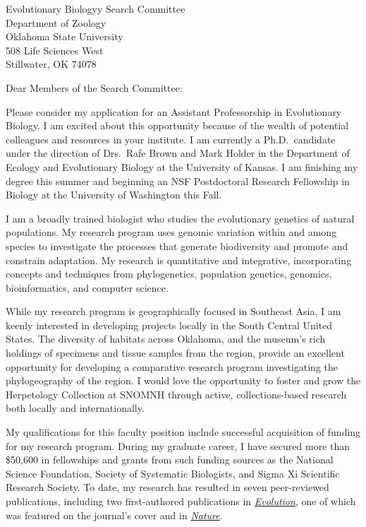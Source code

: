 \documentclass[letterpaper, 10pt]{letter}
\begin{document}
\begin{letter}{Evolutionary Biologyy Search Committee \\
                     Department of Zoology \\
                     Oklahoma State University \\
                     508 Life Sciences West \\
                     Stillwater, OK 74078}
\opening{Dear Members of the Search Committee:}
Please consider my application for an Assistant Professorship in
Evolutionary Biology.
I am excited about this opportunity because of the wealth of potential
colleagues and resources in your institute.
I am currently a Ph.D.\ candidate under the direction of Drs.\ Rafe Brown and
Mark Holder in the Department of Ecology and Evolutionary Biology at the
University of Kansas.
I am finishing my degree this summer and beginning an NSF Postdoctoral Research
Fellowship in Biology at the University of Washington this Fall.

I am a broadly trained biologist who studies the evolutionary genetics of
natural populations.
My research program uses genomic variation within and among species to
investigate the processes that generate biodiversity and promote and constrain
adaptation.
My research is quantitative and integrative, incorporating concepts and
techniques from phylogenetics, population genetics, genomics, bioinformatics,
and computer science.

While my research program is geographically focused in Southeast Asia, I am
keenly interested in developing projects locally in the South Central United
States.
The diversity of habitats across Oklahoma, and the museum's rich holdings of
specimens and tissue samples from the region, provide an excellent opportunity
for developing a comparative research program investigating the phylogeography
of the region.
I would love the opportunity to foster and grow the Herpetology Collection at
SNOMNH through active, collections-based research both locally and
internationally.

My qualifications for this faculty position include successful acquisition of
funding for my research program.
During my graduate career, I have secured more than \$50,600 in fellowships and
grants from such funding sources as the 
National Science Foundation,
Society of Systematic Biologists, and
Sigma Xi Scientific Research Society.
To date, my research has resulted in seven peer-reviewed publications, including
two first-authored publications in
\href{http://onlinelibrary.wiley.com/doi/10.1111/j.1558-5646.2011.01373.x/abstract}{\it
Evolution}, one of which was featured on the journal's cover and in
\href{http://www.nature.com/nature/journal/v474/n7353/full/474545a.html}{\it
Nature}. 


\end{letter}
\end{document}
